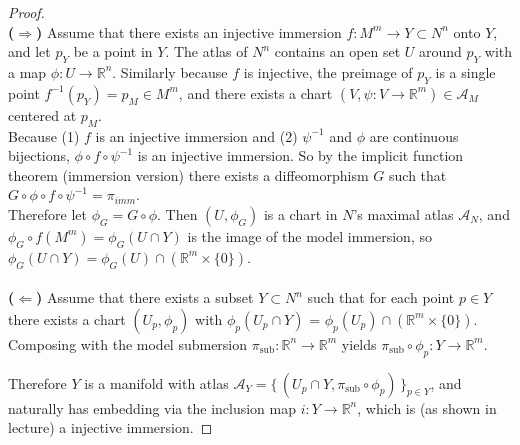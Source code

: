 \documentclass{article}
\newenvironment{problem}[2][Problem]{\begin{trivlist}
\item[\hskip \labelsep {\bfseries #1}\hskip \labelsep {\bfseries #2.}]}{\end{trivlist}}
\begin{document}
\pagebreak

\begin{problem}{3}
\end{problem}

\begin{proof} \text{} \\
  \textbf{($\Longrightarrow$)} Assume that there exists an injective immersion
  $f: M^m \rightarrow Y \subset N^n$ onto $Y$, and let $p_Y$ be a point in $Y$.
  The atlas of $N^n$ contains an open set $U$ around $p_Y$ with a map
  $\phi\colon U \rightarrow \mathbb{R}^n$. Similarly because $f$ is injective,
  the preimage of $p_Y$ is a single point $f^{-1}(p_Y) = p_M \in M^m$,
  and there exists a chart
  $(V, \psi\colon V \rightarrow \mathbb{R}^m) \in \mathcal{A}_{M}$ centered at
  $p_M$.\\

  Because (1) $f$ is an injective immersion and (2) $\psi^{-1}$ and $\phi$ are
  continuous bijections,
  $\phi \circ f \circ \psi^{-1}$ is an injective immersion.
  So by the implicit function theorem (immersion version) there exists a
  diffeomorphism $G$ such that $G \circ \phi \circ f \circ \psi^{-1} = \pi_{imm}$.\\

  Therefore let $\phi_G = G \circ \phi$. Then $(U, \phi_G)$ is a chart in $N$'s maximal atlas $\mathcal{A}_N$, and
  $\phi_G \circ f(M^m) = \phi_G(U \cap Y)$ is the image of the model immersion, so
  $\phi_G(U \cap Y) = \phi_G(U) \cap (\mathbb{R}^m \times \{ 0 \})$.
  \\~\\
%
  \textbf{($\Longleftarrow$)} Assume that there exists a subset $Y \subset N^n$
  such that for each point $p \in Y$ there exists a chart $(U_p, \phi_p)$ with
  $\phi_p(U_p\cap Y)$ = $\phi_p(U_p) \cap (\mathbb{R}^m \times \{ 0\})$. Composing
  with the model submersion $\pi_{\text{sub}}: \mathbb{R}^n \rightarrow \mathbb{R}^m$
  yields $\pi_{\text{sub}} \circ \phi_p: Y \rightarrow \mathbb{R}^m$.

  Therefore $Y$ is a manifold with atlas
  $\mathcal{A}_Y = \{\, (U_p \cap Y, \pi_{\text{sub}} \circ \phi_p) \,\}_{p \in Y}$,
  and naturally has embedding via the inclusion map $i\colon Y \rightarrow \mathbb{R}^n$,
  which is (as shown in lecture) a injective immersion.
\end{proof}

\pagebreak
\end{document}
